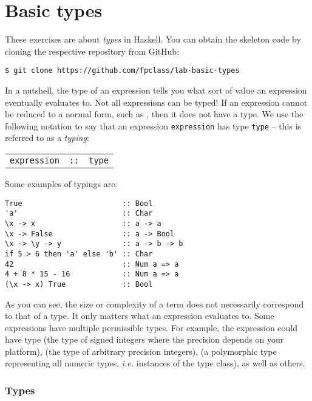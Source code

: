 \section{Basic types}

These exercises are about \emph{types} in Haskell. You can obtain the skeleton code by cloning the respective repository from GitHub:
\begin{verbatim}
$ git clone https://github.com/fpclass/lab-basic-types
\end{verbatim}
In a nutshell, the type of an expression tells you what sort of value an expression eventually evaluates to. Not all expressions can be typed! If an expression cannot be reduced to a normal form, such as , then it does not have a type. We use the following notation to say that an expression \texttt{\small expression} has type \texttt{\small type} -- this is referred to as a \emph{typing}:
\begin{center}
	\begin{tabular}{lcl}
		\texttt{\small expression} & \texttt{\small ::} & \texttt{\small type}
	\end{tabular}
\end{center}
Some examples of typings are:
\begin{verbatim}
True                       :: Bool
'a'                        :: Char 
\x -> x                    :: a -> a
\x -> False                :: a -> Bool 
\x -> \y -> y              :: a -> b -> b
if 5 > 6 then 'a' else 'b' :: Char 
42                         :: Num a => a
4 + 8 * 15 - 16            :: Num a => a
(\x -> x) True             :: Bool
\end{verbatim}
As you can see, the size or complexity of a term does not necessarily correspond to that of a type. It only matters what an expression evaluates to. Some expressions have multiple permissible types. For example, the expression  could have type  (the type of signed integers where the precision depends on your platform),  (the type of arbitrary precision integers),  (a polymorphic type representing all numeric types, \emph{i.e.} instances of the  type class), as well as others.

\subsubsection{Types}

